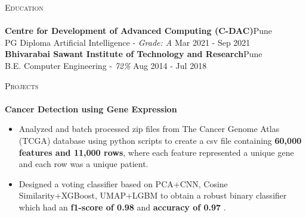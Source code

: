 \documentclass[a4paper]{article}
\newcommand{\lineunder} {
    \vspace*{-8pt} \\
    \hspace*{-18pt} \hrulefill \\
}
\newcommand{\header} [1] {
    {\hspace*{-18pt}\vspace*{6pt} \textsc{#1}}
    \vspace*{-6pt} \lineunder
}
\begin{document}
\vspace*{2mm}

\header{Education}
\textbf{Centre for Development of Advanced Computing (C-DAC)}\hfill Pune\\
PG Diploma Artificial Intelligence - \textit{Grade: A} \hfill Mar 2021 - Sep 2021\\
\vspace{2mm}
\textbf{Bhivarabai Sawant Institute of Technology and Research}\hfill Pune\\
B.E. Computer Engineering - \textit{72\%} \hfill Aug 2014 - Jul 2018\\
\vspace{2mm}

\header{Projects}


{\textbf{Cancer Detection using Gene Expression}}
\begin{itemize} \itemsep 1pt
    \item Analyzed and batch processed zip files from The Cancer Genome Atlas (TCGA) database using python scripts to create a csv file containing \textbf{60,000 features and 11,000 rows}, where each feature represented a unique gene and each row was a unique patient.
    \item Designed a voting classifier based on PCA+CNN, Cosine Similarity+XGBoost, UMAP+LGBM to obtain a robust binary classifier which had an \textbf{f1-score of 0.98} and \textbf{accuracy of 0.97} .
          \\
\end{itemize}
\vspace*{2mm}
\end{document}
